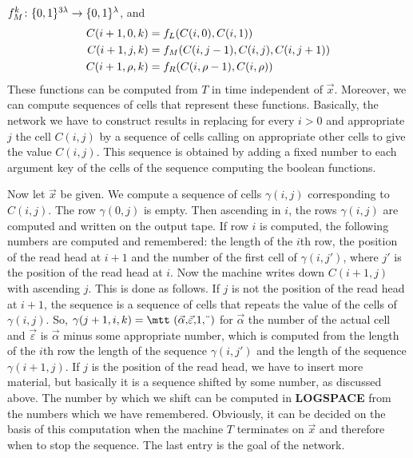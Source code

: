 $f^k_M \colon \{0,1\}^{3\lambda} \rightarrow \{0,1\}^{\lambda}$, and
\begin{align}
\notag
C(i+1,0,k) & = f_L(C(i,0), C(i,1)) \\
C(i+1,j,k) & = f_M(C(i,j-1), C(i,j), C(i,j+1)) \\
\notag
C(i+1,\rho,k) & = f_R(C(i,\rho-1), C(i,\rho))
\end{align}
These functions can be computed from $T$ in
time independent of $\vec{x}$. Moreover, we can compute
sequences of cells that represent these functions. Basically,
the network we have to construct results in replacing for every
$i > 0$ and appropriate $j$ the cell $C(i,j)$ by a sequence of
cells calling on appropriate other cells to give the value $C(i,j)$.
This sequence is obtained by adding a fixed number to each argument
key of the cells of the sequence computing the boolean functions.

Now let $\vec{x}$ be given. We compute a sequence of cells
$\gamma(i,j)$ corresponding to $C(i,j)$. The row $\gamma(0,j)$
is empty. Then ascending in $i$, the rows $\gamma(i,j)$ are
computed and written on the output tape. If row $i$ is
computed, the following numbers are computed and remembered:
the length of the $i$th row, the position of the read head at
$i+1$ and the number of the first cell of $\gamma(i,j')$,
where $j'$ is the position of the read head at $i$. Now the
machine writes down $C(i+1,j)$ with ascending $j$. This is done
as follows. If $j$ is not the position of the read head at $i+1$,
the sequence is a sequence of cells that repeats the value of the
cells of $\gamma(i,j)$. So, $\gamma(j+1,i,k)
= \mbox{\mtt ($\vec{\alpha}$,$\vec{\varepsilon}$,1,\symbol{4})}$
for $\vec{\alpha}$ the number of the actual cell and
$\vec{\varepsilon}$ is $\vec{\alpha}$ minus some appropriate
number, which is computed from the length of the $i$th row
the length of the sequence $\gamma(i,j')$ and the length of
the sequence $\gamma(i+1,j)$. If $j$ is the position of the
read head, we have to insert more material, but basically
it is a sequence shifted by some number, as discussed above. The 
number by which we shift can be computed in \textbf{LOGSPACE} 
from the numbers which we have remembered. Obviously, it can be 
decided on the basis of this computation when the machine $T$ 
terminates on $\vec{x}$ and therefore when to stop the sequence. 
The last entry is the goal of the network.
\proofend

